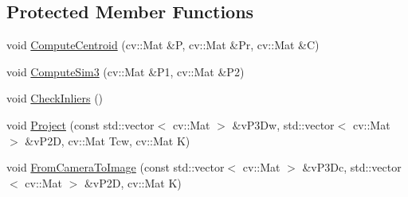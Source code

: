 \subsection*{Protected Member Functions}
\begin{DoxyCompactItemize}
\item 
void \mbox{\hyperlink{class_o_r_b___s_l_a_m2_1_1_sim3_solver_aad8da5d1d78fcd8d6511ad29d9cb6db5}{Compute\+Centroid}} (cv\+::\+Mat \&P, cv\+::\+Mat \&Pr, cv\+::\+Mat \&C)
\item 
void \mbox{\hyperlink{class_o_r_b___s_l_a_m2_1_1_sim3_solver_a87ee2729feee5729397c650b26927a8f}{Compute\+Sim3}} (cv\+::\+Mat \&P1, cv\+::\+Mat \&P2)
\item 
void \mbox{\hyperlink{class_o_r_b___s_l_a_m2_1_1_sim3_solver_a7abb9ede799e916a5c5954c2c8da09c7}{Check\+Inliers}} ()
\item 
void \mbox{\hyperlink{class_o_r_b___s_l_a_m2_1_1_sim3_solver_af44c59a21d53b04ec7f867b8291dcf25}{Project}} (const std\+::vector$<$ cv\+::\+Mat $>$ \&v\+P3\+Dw, std\+::vector$<$ cv\+::\+Mat $>$ \&v\+P2D, cv\+::\+Mat Tcw, cv\+::\+Mat K)
\item 
void \mbox{\hyperlink{class_o_r_b___s_l_a_m2_1_1_sim3_solver_afbe734fae65ebb9b1c9a38ebd3bacbc3}{From\+Camera\+To\+Image}} (const std\+::vector$<$ cv\+::\+Mat $>$ \&v\+P3\+Dc, std\+::vector$<$ cv\+::\+Mat $>$ \&v\+P2D, cv\+::\+Mat K)
\end{DoxyCompactItemize}
